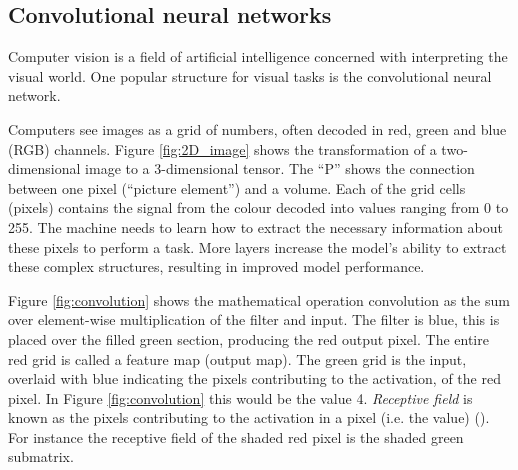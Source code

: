 \subsection{Convolutional neural networks} \label{sec:convolutional neural network}
Computer vision is a field of artificial intelligence concerned with interpreting the visual world. One popular structure for visual tasks is the convolutional neural network. %

Computers see images as a grid of numbers, often decoded in red, green and blue (RGB) channels. Figure \ref{fig:2D_image} shows the transformation of a two-dimensional image to a 3-dimensional tensor. The ``P'' shows the connection between one pixel (``picture element'') and a volume. Each of the grid cells (pixels) contains the signal from the colour decoded into values ranging from 0 to 255. The machine needs to learn how to extract the necessary information about these pixels to perform a task. More layers increase the model's ability to extract these complex structures, resulting in improved model performance. 

Figure \ref{fig:convolution} shows the mathematical operation convolution as the sum over element-wise multiplication of the filter and input. The filter is blue, this is placed over the filled green section, producing the red output pixel. The entire red grid is called a feature map (output map). The green grid is the input, overlaid with blue indicating the pixels contributing to the activation, of the red pixel. In Figure \ref{fig:convolution} this would be the value 4. \textit{Receptive field} is known as the pixels contributing to the activation in a pixel (i.e. the value) (\cite{Luo2016UnderstandingNetworks}). For instance the receptive field of the shaded red pixel is the shaded green submatrix.

